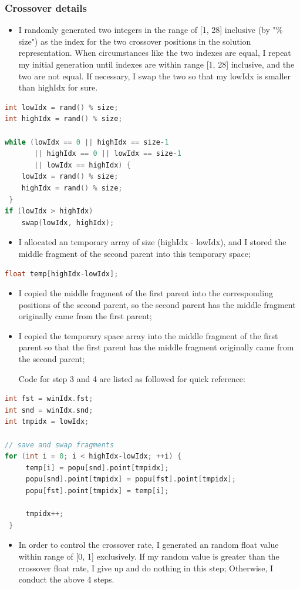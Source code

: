 \documentclass[10pt,b5paper]{article}
\begin{document}
\subsubsection{Crossover details}
\label{sec-2-8-1}
\begin{itemize}
\item I randomly generated two integers in the range of [1, 28] inclusive (by "\% size") as the index for the two crossover positions in the solution representation. When circumstances like the two indexes are equal, I repeat my initial generation until indexes are within range [1, 28] inclusive, and the two are not equal. If necessary, I swap the two so that my lowIdx is smaller than highIdx for sure.
\end{itemize}
\begin{lstlisting}[language=c++]
int lowIdx = rand() % size;
int highIdx = rand() % size;
    
while (lowIdx == 0 || highIdx == size-1
       || highIdx == 0 || lowIdx == size-1
       || lowIdx == highIdx) {    
    lowIdx = rand() % size;
    highIdx = rand() % size;
 }
if (lowIdx > highIdx)
    swap(lowIdx, highIdx);
\end{lstlisting}
\begin{itemize}
\item I allocated an temporary array of size (highIdx - lowIdx), and I stored the middle fragment of the second parent into this temporary space;
\end{itemize}
\begin{lstlisting}[language=c++]
float temp[highIdx-lowIdx];
\end{lstlisting}
\begin{itemize}
\item I copied the middle fragment of the first parent into the corresponding positions of the second parent, so the second parent has the middle fragment originally came from the first parent;
\item I copied the temporary space array into the middle fragment of the first parent so that the first parent has the middle fragment originally came from the second parent;

Code for step 3 and 4 are listed as followed for quick reference:
\end{itemize}
\begin{lstlisting}[language=c++]
int fst = winIdx.fst;
int snd = winIdx.snd;
int tmpidx = lowIdx;

// save and swap fragments 
for (int i = 0; i < highIdx-lowIdx; ++i) { 
     temp[i] = popu[snd].point[tmpidx];
     popu[snd].point[tmpidx] = popu[fst].point[tmpidx];
     popu[fst].point[tmpidx] = temp[i];
        
     tmpidx++;
 }
\end{lstlisting}
\begin{itemize}
\item In order to control the crossover rate, I generated an random float value within range of [0, 1] exclusively. If my random value is greater than the crossover float rate, I give up and do nothing in this step; Otherwise, I conduct the above 4 steps.
\end{itemize}
\end{document}
